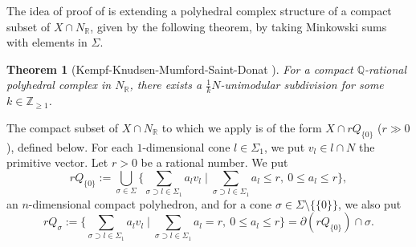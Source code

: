 \documentclass[12pt,a4]{amsart}
\newtheorem{thm}{Theorem}[section]
\def\R{\mathbb{R}}
\def\Z{\mathbb{Z}}
\def\Q{\mathbb{Q}}
\numberwithin{equation}{section}
\numberwithin{figure}{section}
\begin{document}
  The idea of proof of  is 
  extending  
   a polyhedral complex structure 
   of a compact subset  of 
   $X \cap N_\R$,
   given by the following theorem, 
     by taking Minkowski sums with elements in $ \Sigma$.

  \begin{thm}[{Kempf-Knudsen-Mumford-Saint-Donat
  \cite[Chapter III, Theorem 4.1]{KempfKnudsenMumfordSaint-DonatToroidalEmbeddings11973}}]
    \label{KKMSD unimodular triangulation:label}
    For a compact $\Q$-rational polyhedral complex 
      in $N_\R$,
    there exists a $\frac{1}{k} N $-unimodular subdivision  for some $k \in \Z_{\geq 1}$.
  \end{thm}


  The compact subset of $X \cap N_\R$ to which we apply 
   is of the form $X \cap rQ_{ \{ 0 \} }$ ($ r \gg 0$), defined below.
  For each $1$-dimensional cone $l \in \Sigma_1$, 
   we put $v_l \in l \cap N$ the primitive vector. 
    Let $ r >0$ be a rational number.
    We put
    $$ rQ_{ \{ 0 \} } 
       := \bigcup_{ \sigma \in \Sigma} 
       \{ \sum_{ \sigma \supset l \in \Sigma_1 } 
           a_l v_l \mid 
               \sum_{ \sigma \supset l \in \Sigma_1 } 
                  a_l \leq  r,  \ 0 \leq a_l \leq r\} , $$
      an $n$-dimensional compact polyhedron, 
     and for a cone $\sigma \in \Sigma \setminus \{ \{ 0 \} \}$, 
    we also put 
    $$ rQ_{\sigma} := \{ \sum_{ \sigma \supset l \in \Sigma_1 } 
           a_l v_l \mid 
               \sum_{ \sigma \supset l \in \Sigma_1 } 
                  a_l = r, \ 0 \leq a_l \leq r  \} = \partial (rQ_{\{ 0 \}}) \cap \sigma. $$
    
\end{document}
